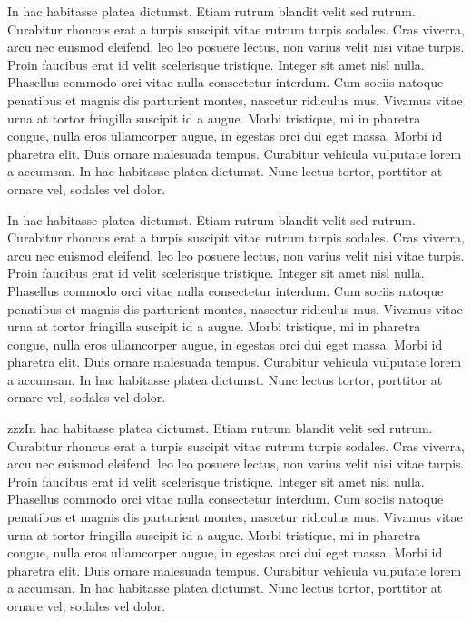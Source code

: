 In hac habitasse platea dictumst. Etiam rutrum blandit velit sed
rutrum. Curabitur rhoncus erat a turpis suscipit vitae rutrum turpis
sodales. Cras viverra, arcu nec euismod eleifend, leo leo posuere
lectus, non varius velit nisi vitae turpis. Proin faucibus erat id
velit scelerisque tristique. Integer sit amet nisl nulla. Phasellus
commodo orci vitae nulla consectetur interdum. Cum sociis natoque
penatibus et magnis dis parturient montes, nascetur ridiculus
mus. Vivamus vitae urna at tortor fringilla suscipit id a augue. Morbi
tristique, mi in pharetra congue, nulla eros ullamcorper augue, in
egestas orci dui eget massa. Morbi id pharetra elit. Duis ornare
malesuada tempus. Curabitur vehicula vulputate lorem a accumsan. In
hac habitasse platea dictumst. Nunc lectus tortor, porttitor at ornare
vel, sodales vel dolor.

In hac habitasse platea dictumst. Etiam rutrum blandit velit sed
rutrum. Curabitur rhoncus erat a turpis suscipit vitae rutrum turpis
sodales. Cras viverra, arcu nec euismod eleifend, leo leo posuere
lectus, non varius velit nisi vitae turpis. Proin faucibus erat id
velit scelerisque tristique. Integer sit amet nisl nulla. Phasellus
commodo orci vitae nulla consectetur interdum. Cum sociis natoque
penatibus et magnis dis parturient montes, nascetur ridiculus
mus. Vivamus vitae urna at tortor fringilla suscipit id a augue. Morbi
tristique, mi in pharetra congue, nulla eros ullamcorper augue, in
egestas orci dui eget massa. Morbi id pharetra elit. Duis ornare
malesuada tempus. Curabitur vehicula vulputate lorem a accumsan. In
hac habitasse platea dictumst. Nunc lectus tortor, porttitor at ornare
vel, sodales vel dolor.

zzzIn hac habitasse platea dictumst. Etiam rutrum blandit velit sed
rutrum. Curabitur rhoncus erat a turpis suscipit vitae rutrum turpis
sodales. Cras viverra, arcu nec euismod eleifend, leo leo posuere
lectus, non varius velit nisi vitae turpis. Proin faucibus erat id
velit scelerisque tristique. Integer sit amet nisl nulla. Phasellus
commodo orci vitae nulla consectetur interdum. Cum sociis natoque
penatibus et magnis dis parturient montes, nascetur ridiculus
mus. Vivamus vitae urna at tortor fringilla suscipit id a augue. Morbi
tristique, mi in pharetra congue, nulla eros ullamcorper augue, in
egestas orci dui eget massa. Morbi id pharetra elit. Duis ornare
malesuada tempus. Curabitur vehicula vulputate lorem a accumsan. In
hac habitasse platea dictumst. Nunc lectus tortor, porttitor at ornare
vel, sodales vel dolor.

